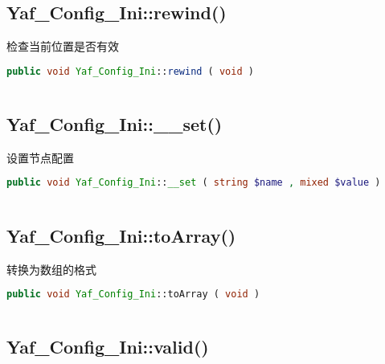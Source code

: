 \begin{lstlisting}[language=PHP]

\end{lstlisting}



\subsection{Yaf\_Config\_Ini::rewind()}

检查当前位置是否有效

\begin{lstlisting}[language=PHP]
public void Yaf_Config_Ini::rewind ( void )
\end{lstlisting}

\begin{lstlisting}[language=PHP]

\end{lstlisting}



\subsection{Yaf\_Config\_Ini::\_\_set()}

设置节点配置

\begin{lstlisting}[language=PHP]
public void Yaf_Config_Ini::__set ( string $name , mixed $value )
\end{lstlisting}

\begin{lstlisting}[language=PHP]

\end{lstlisting}



\subsection{Yaf\_Config\_Ini::toArray()}

转换为数组的格式

\begin{lstlisting}[language=PHP]
public void Yaf_Config_Ini::toArray ( void )
\end{lstlisting}

\begin{lstlisting}[language=PHP]

\end{lstlisting}



\subsection{Yaf\_Config\_Ini::valid()}

